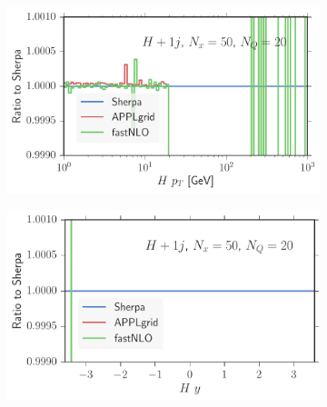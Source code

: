 \begin{figure}
\centering
\begin{subfigure}[]{0.49\textwidth}
	\includegraphics[width=\textwidth]{images/hjrs_hpt.pdf}
\end{subfigure}
\begin{subfigure}[]{0.49\textwidth}
	\includegraphics[width=\textwidth]{images/hjrs_hy.pdf}
\end{subfigure}


\end{figure}
